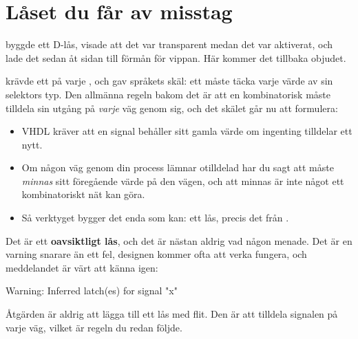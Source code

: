 \section{Låset du får av misstag}
\label{c5:sec:latch}

 byggde ett D-lås, visade att det var transparent medan det var aktiverat, och lade
det sedan åt sidan till förmån för vippan. Här kommer det tillbaka objudet.

 krävde ett  på varje , och gav språkets skäl:
ett  måste täcka varje värde av sin selektors typ. Den allmänna regeln bakom det är att
en kombinatorisk  måste tilldela sin utgång på \emph{varje} väg genom sig, och det
skälet går nu att formulera:
\begin{itemize}
  \item VHDL kräver att en signal behåller sitt gamla värde om ingenting tilldelar ett nytt.
  \item Om någon väg genom din process lämnar  otilldelad har du sagt att  måste
    \emph{minnas} sitt föregående värde på den vägen, och att minnas är inte något ett
    kombinatoriskt nät kan göra.
  \item Så verktyget bygger det enda som kan: ett lås, precis det från .
\end{itemize}

Det är ett \textbf{oavsiktligt lås}, och det är nästan aldrig vad någon menade. Det är en varning
snarare än ett fel, designen kommer ofta att verka fungera, och meddelandet är värt att känna igen:

\begin{console}
Warning: Inferred latch(es) for signal "x"
\end{console}

Åtgärden är aldrig att lägga till ett lås med flit. Den är att tilldela signalen på varje väg,
vilket är regeln du redan följde.
